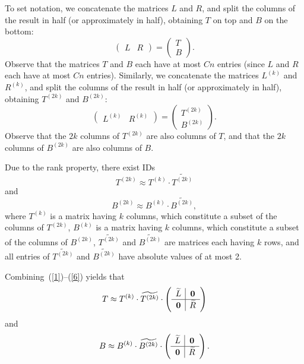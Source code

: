 \documentclass[final,3p,times]{elsarticle}
\def\0s{{\bf 0}}
\begin{document}
To set notation, we concatenate the matrices $L$ and $R$,
and split the columns of the result in half (or approximately in half),
obtaining $T$ on top and $B$ on the bottom:
\begin{equation}
\label{3}
\left( \begin{array}{c|c} L & R \end{array} \right)
= \left( \begin{array}{c} T \\\hline B \end{array} \right).
\end{equation}
Observe that the matrices $T$ and $B$ each have at most $Cn$ entries
(since $L$ and $R$ each have at most $Cn$ entries).
Similarly, we concatenate the matrices $L^{(k)}$ and $R^{(k)}$,
and split the columns of the result in half (or approximately in half),
obtaining $T^{(2k)}$ and $B^{(2k)}$:
\begin{equation}
\label{4}
\left( \begin{array}{c|c} L^{(k)} & R^{(k)} \end{array} \right)
= \left( \begin{array}{c} T^{(2k)} \\\hline B^{(2k)} \end{array} \right).
\end{equation}
Observe that the $2k$ columns of $T^{(2k)}$ are also columns of $T$,
and that the $2k$ columns of $B^{(2k)}$ are also columns of $B$.

Due to the rank property, there exist IDs
\begin{equation}
\label{5}
T^{(2k)} \approx T^{(k)} \cdot \widetilde{T^{(2k)}}
\end{equation}
and
\begin{equation}
\label{6}
B^{(2k)} \approx B^{(k)} \cdot \widetilde{B^{(2k)}},
\end{equation}
where $T^{(k)}$ is a matrix having $k$ columns,
which constitute a subset of the columns of $T^{(2k)}$,
$B^{(k)}$ is a matrix having $k$ columns,
which constitute a subset of the columns of $B^{(2k)}$,
$\widetilde{T^{(2k)}}$ and $\widetilde{B^{(2k)}}$ are matrices
each having $k$ rows, and all entries of $\widetilde{T^{(2k)}}$
and $\widetilde{B^{(2k)}}$ have absolute values of at most 2.

Combining~(\ref{1})--(\ref{6}) yields that
\begin{equation}
\label{top}
T \approx T^{(k)} \cdot \widetilde{T^{(2k)}}
\cdot \left( \begin{array}{c|c} \widetilde{L} & \0s \\\hline
                                \0s & \widetilde{R} \end{array} \right)
\end{equation}
and
\begin{equation}
\label{bottom}
B \approx B^{(k)} \cdot \widetilde{B^{(2k)}}
\cdot \left( \begin{array}{c|c} \widetilde{L} & \0s \\\hline
                                \0s & \widetilde{R} \end{array} \right).
\end{equation}
\end{document}
